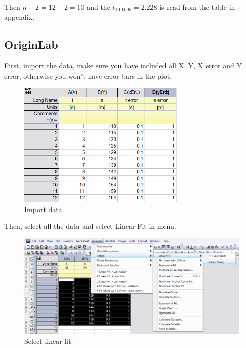 \documentclass[12pt]{article}
\begin{document}
Then $n-2=12-2=10$ and the $t_{10,0.95}=2.228$ is read from the table in appendix.

\newpage
\subsection{OriginLab}

First, import the data, make sure you have included all X, Y, X error and Y error, otherwise you won't have error bars in the plot.

\begin{figure}[H]
\centering
\includegraphics[width=8cm]{o1.png}
\caption{Import data.}
\end{figure}

Then, select all the data and select \textsf{Linear Fit} in menu.

\begin{figure}[H]
\centering
\includegraphics[width=16cm]{o2.png}
\caption{Select linear fit.}
\end{figure}

\newpage
\end{document}
